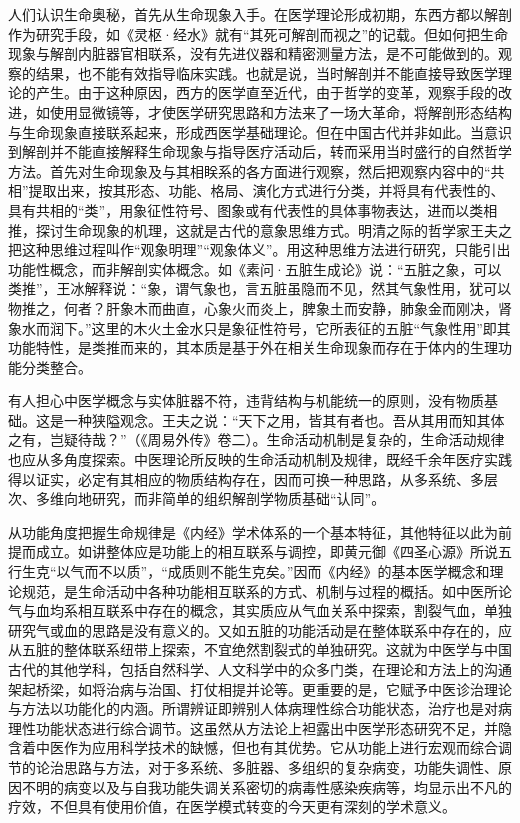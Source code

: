 \documentclass[draft,12pt]{ctexbook}
\begin{document}
人们认识生命奥秘，首先从生命现象入手。在医学理论形成初期，东西方都以解剖作为研究手段，如《灵枢·经水》就有“其死可解剖而视之”的记载。但如何把生命现象与解剖内脏器官相联系，没有先进仪器和精密测量方法，是不可能做到的。观察的结果，也不能有效指导临床实践。也就是说，当时解剖并不能直接导致医学理论的产生。由于这种原因，西方的医学直至近代，由于哲学的变革，观察手段的改进，如使用显微镜等，才使医学研究思路和方法来了一场大革命，将解剖形态结构与生命现象直接联系起来，形成西医学基础理论。但在中国古代并非如此。当意识到解剖并不能直接解释生命现象与指导医疗活动后，转而采用当时盛行的自然哲学方法。首先对生命现象及与其相眹系的各方面进行观察，然后把观察内容中的“共相”提取出来，按其形态、功能、格局、演化方式进行分类，并将具有代表性的、具有共相的“类”，用象征性符号、图象或有代表性的具体事物表达，进而以类相推，探讨生命现象的机理，这就是古代的意象思维方式。明清之际的哲学家王夫之把这种思维过程叫作“观象明理”“观象体义”。用这种思维方法进行研究，只能引出功能性概念，而非解剖实体概念。如《素问·五脏生成论》说：“五脏之象，可以类推”，王冰解释说：“象，谓气象也，言五脏虽隐而不见，然其气象性用，犹可以物推之，何者？肝象木而曲直，心象火而炎上，脾象土而安静，肺象金而刚决，肾象水而润下。”这里的木火土金水只是象征性符号，它所表征的五脏“气象性用”即其功能特性，是类推而来的，其本质是基于外在相关生命现象而存在于体内的生理功能分类整合。

有人担心中医学概念与实体脏器不符，违背结构与机能统一的原则，没有物质基础。这是一种狭隘观念。王夫之说：“天下之用，皆其有者也。吾从其用而知其体之有，岂疑待哉？”（《周易外传》卷二）。生命活动机制是复杂的，生命活动规律也应从多角度探索。中医理论所反映的生命活动机制及规律，既经千余年医疗实践得以证实，必定有其相应的物质结构存在，因而可换一种思路，从多系统、多层次、多维向地研究，而非简单的组织解剖学物质基础“认同”。

从功能角度把握生命规律是《内经》学术体系的一个基本特征，其他特征以此为前提而成立。如讲整体应是功能上的相互联系与调控，即黄元御《四圣心源》所说五行生克“以气而不以质”，“成质则不能生克矣。”因而《内经》的基本医学概念和理论规范，是生命活动中各种功能相互联系的方式、机制与过程的概括。如中医所论气与血均系相互联系中存在的概念，其实质应从气血关系中探索，割裂气血，单独研究气或血的思路是没有意义的。又如五脏的功能活动是在整体联系中存在的，应从五脏的整体联系纽带上探索，不宜绝然割裂式的单独研究。这就为中医学与中国古代的其他学科，包括自然科学、人文科学中的众多门类，在理论和方法上的沟通架起桥梁，如将治病与治国、打仗相提并论等。更重要的是，它赋予中医诊治理论与方法以功能化的内涵。所谓辨证即辨别人体病理性综合功能状态，治疗也是对病理性功能状态进行综合调节。这虽然从方法论上袒露出中医学形态研究不足，并隐含着中医作为应用科学技术的缺憾，但也有其优势。它从功能上进行宏观而综合调节的论治思路与方法，对于多系统、多脏器、多组织的复杂病变，功能失调性、原因不明的病变以及与自我功能失调关系密切的病毒性感染疾病等，均显示出不凡的疗效，不但具有使用价值，在医学模式转变的今天更有深刻的学术意义。
\end{document}
